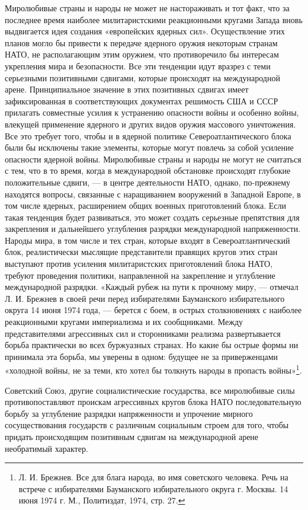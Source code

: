 \documentclass[12pt, a4paper, openany]{book}
\begin{document}
	Миролюбивые страны и народы не может не настораживать и тот факт, что за последнее время наиболее милитаристскими реакционными кругами Запада вновь выдвигается идея создания «европейских ядерных сил». Осуществление этих планов могло бы привести к передаче ядерного оружия некоторым странам НАТО, не располагающим этим оружием, что противоречило бы интересам укрепления мира и безопасности. Все эти тенденции идут вразрез с теми серьезными позитивными сдвигами, которые происходят на международной арене. Принципиальное значение в этих позитивных сдвигах имеет зафиксированная в соответствующих документах решимость США и СССР прилагать совместные усилия к устранению опасности войны и особенно войны, влекущей применение ядерного и других видов оружия массового уничтожения. Все это требует того, чтобы и в ядерной политике Североатлантического блока были бы исключены такие элементы, которые могут повлечь за собой усиление опасности ядерной войны. Миролюбивые страны и народы не могут не считаться с тем, что в то время, когда в международной обстановке происходят глубокие положительные сдвиги, — в центре деятельности НАТО, однако, по-прежнему находятся вопросы, связанные с наращиванием вооружений в Западной Европе, в том числе ядерных, расширением общих военных приготовлений блока. Если такая тенденция будет развиваться, это может создать серьезные препятствия для закрепления и дальнейшего углубления разрядки международной напряженности. Народы мира, в том числе и тех стран, которые входят в Североатлантический блок, реалистически мыслящие представители правящих кругов этих стран выступают против усиления милитаристских приготовлений блока НАТО, требуют проведения политики, направленной на закрепление и углубление международной разрядки. «Каждый рубеж на пути к прочному миру, — отмечал Л. И. Брежнев в своей речи перед избирателями Бауманского избирательного округа 14 июня 1974 года, — берется с боем, в острых столкновениях с наиболее реакционными кругами империализма и их сообщниками. Между представителями агрессивных сил и сторонниками реализма развертывается борьба практически во всех буржуазных странах. Но какие бы острые формы ни принимала эта борьба, мы уверены в одном: будущее не за приверженцами «холодной войны, не за теми, кто хотел бы толкнуть народы в пропасть войны»{\footnote{Л. И. Брежнев. Все для блага народа, во имя советского человека. Речь на встрече с избирателями Бауманского избирательного округа г. Москвы. 14 июня 1974 г. М., Политиздат, 1974, стр. 27.}}.
	
	Советский Союз, другие социалистические государства, все миролюбивые силы противопоставляют проискам агрессивных кругов блока НАТО последовательную борьбу за углубление разрядки напряженности и упрочение мирного сосуществования государств с различным социальным строем для того, чтобы придать происходящим позитивным сдвигам на международной арене необратимый характер.
	
\end{document}
